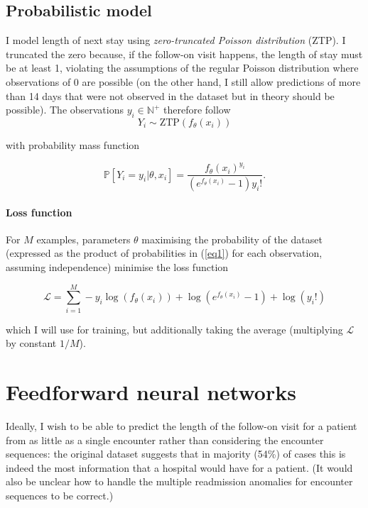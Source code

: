 \documentclass[10pt, twocolumn]{article}
\begin{document}
\subsection{Probabilistic model}
I model length of next stay using \textit{zero-truncated Poisson distribution} (ZTP). I truncated the zero because, if the follow-on visit happens, the length of stay must be at least 1, violating the assumptions of the regular Poisson distribution where observations of 0 are possible (on the other hand, I still allow predictions of more than 14 days that were not observed in the dataset but in theory should be possible). The observations $y_i \in \mathbb{N}^+$ therefore follow \[Y_i \sim \mathrm{ZTP}(f_\theta(x_i))\]

with probability mass function 

\begin{equation}
	\mathbb{P}[Y_i = y_i | \theta, x_i] = \frac{f_\theta(x_i)^{y_i}}{(e^{f_\theta(x_i)} - 1)y_i!}.
	\label{eq1}
\end{equation}

\paragraph{Loss function} For $M$ examples, parameters $\theta$ maximising the probability of the dataset (expressed as the product of probabilities in (\ref{eq1}) for each observation, assuming independence) minimise the loss function

\begin{equation}
	\mathcal{L} = \sum\limits_{i=1}^{M} -y_i \log(f_\theta(x_i)) + \log(e^{f_\theta(x_i)} - 1) + \log(y_i!)
\end{equation}

which I will use for training, but additionally taking the average (multiplying $\mathcal{L}$ by constant $1/M$).



\section{Feedforward neural networks}
Ideally, I wish to be able to predict the length of the follow-on visit for a patient from as little as a single encounter rather than considering the encounter sequences: the original dataset suggests that in majority (54\%) of cases this is indeed the most information that a hospital would have for a patient. (It would also be unclear how to handle the multiple readmission anomalies for encounter sequences to be correct.)
\end{document}
